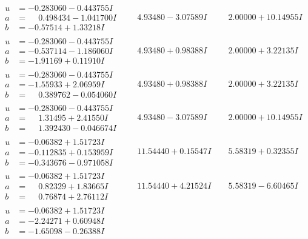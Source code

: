 \documentclass[1p]{elsarticle_modified}
\theoremstyle{definition}
\begin{document}
$$\begin{array}{c|c|c}
\begin{aligned}
u &= -0.283060 - 0.443755 I \\
a &= \phantom{-}0.498434 - 1.041700 I \\
b &= -0.57514 + 1.33218 I\end{aligned}
 & \phantom{-}4.93480 - 3.07589 I & \phantom{-}2.00000 + 10.14955 I \\ \hline\begin{aligned}
u &= -0.283060 - 0.443755 I \\
a &= -0.537114 - 1.186060 I \\
b &= -1.91169 + 0.11910 I\end{aligned}
 & \phantom{-}4.93480 + 0.98388 I & \phantom{-}2.00000 + 3.22135 I \\ \hline\begin{aligned}
u &= -0.283060 - 0.443755 I \\
a &= -1.55933 + 2.06959 I \\
b &= \phantom{-}0.389762 - 0.054060 I\end{aligned}
 & \phantom{-}4.93480 + 0.98388 I & \phantom{-}2.00000 + 3.22135 I \\ \hline\begin{aligned}
u &= -0.283060 - 0.443755 I \\
a &= \phantom{-}1.31495 + 2.41550 I \\
b &= \phantom{-}1.392430 - 0.046674 I\end{aligned}
 & \phantom{-}4.93480 - 3.07589 I & \phantom{-}2.00000 + 10.14955 I \\ \hline\begin{aligned}
u &= -0.06382 + 1.51723 I \\
a &= -0.112835 + 0.153959 I \\
b &= -0.343676 - 0.971058 I\end{aligned}
 & \phantom{-}11.54440 + 0.15547 I & \phantom{-}5.58319 + 0.32355 I \\ \hline\begin{aligned}
u &= -0.06382 + 1.51723 I \\
a &= \phantom{-}0.82329 + 1.83665 I \\
b &= \phantom{-}0.76874 + 2.76112 I\end{aligned}
 & \phantom{-}11.54440 + 4.21524 I & \phantom{-}5.58319 - 6.60465 I \\ \hline\begin{aligned}
u &= -0.06382 + 1.51723 I \\
a &= -2.24271 + 0.60948 I \\
b &= -1.65098 - 0.26388 I\end{aligned}

\end{array}$$
\end{document}
